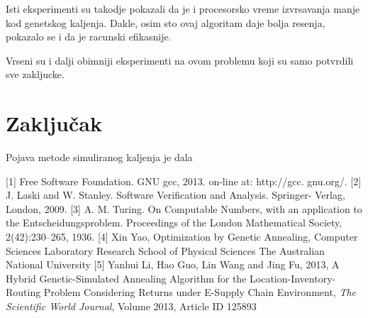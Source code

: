 \documentclass[a4paper]{article}
\begin{document}
Isti eksperimenti su takodje pokazali da je i procesorsko vreme izvrsavanja manje kod genetskog kaljenja. Dakle, osim sto ovaj algoritam daje bolja resenja, pokazalo se i da je racunski efikasnije. \par Vrseni su i dalji obimniji eksperimenti na ovom problemu koji su samo potvrdili sve zakljucke.


\section{Zaključak}
\label{sec:zakljucak}

Pojava metode simuliranog kaljenja je dala 

\newpage
{}

\appendix

 



[1] Free Software Foundation. GNU gcc, 2013. on-line at: http://gcc.
gnu.org/.
[2] J. Laski and W. Stanley. Software Verification and Analysis. Springer-
Verlag, London, 2009.
[3] A. M. Turing. On Computable Numbers, with an application to the
Entscheidungsproblem. Proceedings of the London Mathematical Society,
2(42):230–265, 1936.
[4] Xin Yao, Optimization by Genetic Annealing, Computer Sciences Laboratory
Research School of Physical Sciences
The Australian National University
[5] Yanhui Li, Hao Guo, Lin Wang and Jing Fu, 2013, A Hybrid Genetic-Simulated Annealing Algorithm for the Location-Inventory-Routing Problem Considering Returns under E-Supply Chain Environment, \textit{The Scientific World Journal}, Volume 2013, Article ID 125893
\end{document}
